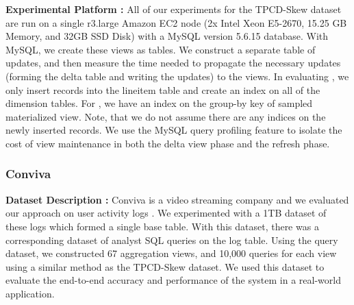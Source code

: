 \vspace{0.5em}

{\noindent \bf Experimental Platform :}
All of our experiments for the TPCD-Skew dataset are run on a single r3.large Amazon EC2 node (2x Intel Xeon E5-2670, 15.25 GB Memory, and 32GB SSD Disk) with a MySQL version 5.6.15 database.
With MySQL, we create these views as tables.
We construct a separate table of updates, and then measure the time needed to propagate the necessary updates (forming the delta table and writing the updates) to the views.
In evaluating \fjview, we only insert records into the lineitem table and create an index on all of the dimension tables.
For \aggview, we have an index on the group-by key of sampled materialized view.
Note, that we do not assume there are any indices on the newly inserted records.
We use the MySQL query profiling feature to isolate the cost of view maintenance in both the delta view phase and the refresh phase.

\subsubsection{Conviva}
{\noindent \bf Dataset Description :}
Conviva is a video streaming company and we evaluated our approach on user activity logs \cite{conviva}.
We experimented with a 1TB dataset of these logs which formed a single base table.
With this dataset, there was a corresponding dataset of analyst SQL queries on the log table.
Using the query dataset, we constructed 67 aggregation views, and 10,000 queries for each view using a similar method as the TPCD-Skew dataset. 
We used this dataset to evaluate the end-to-end accuracy and performance of the system in a real-world application. %

\vspace{0.5em}

